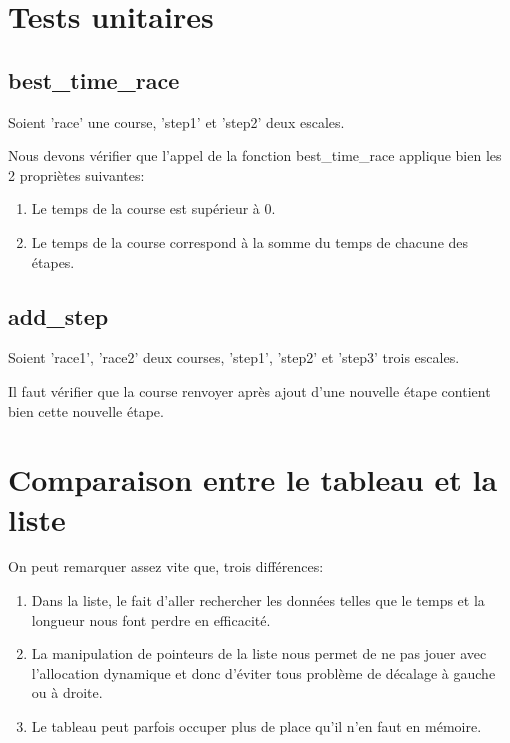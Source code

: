 \documentclass[a4paper, 11pt, oneside]{article}
\begin{document}
\section{Tests unitaires}

\subsection{best\_time\_race}
Soient 'race' une course, 'step1' et 'step2' deux escales.

Nous devons vérifier que l'appel de la fonction best\_time\_race applique bien les 2 propriètes suivantes:
\begin{enumerate}
    \item Le temps de la course est supérieur à 0.
    \item Le temps de la course correspond à la somme du temps de chacune des étapes.
\end{enumerate}

\subsection{add\_step}
Soient 'race1', 'race2' deux courses, 'step1', 'step2' et 'step3' trois escales.

Il faut vérifier que la course renvoyer après ajout d'une nouvelle étape contient bien cette nouvelle étape.


\section{Comparaison entre le tableau et la liste}

\noindent On peut remarquer assez vite que, trois différences:
\begin{enumerate}
    \item Dans la liste, le fait d'aller rechercher les données telles que le temps et la longueur nous font perdre en efficacité.
    \item La manipulation de pointeurs de la liste nous permet de ne pas jouer avec l'allocation dynamique et donc d'éviter tous problème de décalage à gauche ou à droite. 
    \item Le tableau peut parfois occuper plus de place qu'il n'en faut en mémoire.
\end{enumerate}
\end{document}
